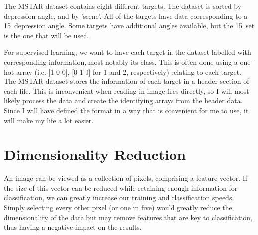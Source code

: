 The MSTAR dataset contains eight different targets. The dataset is sorted by depression angle, and by 'scene'. All of the targets have data corresponding to a 15\degree ~depression angle. Some targets have additional angles available, but the 15\degree ~set is the one that will be used. 

For supervised learning, we want to have each target in the dataset labelled with corresponding information, most notably its class. This is often done using a one-hot array (i.e. [1 0 0], [0 1 0] for 1 and 2, respectively) relating to each target. The MSTAR dataset stores the information of each target in a header section of each file. This is inconvenient when reading in image files directly, so I will most likely process the data and create the identifying arrays from the header data. Since I will have defined the format in a way that is convenient for me to use, it will make my life a lot easier.

\section{Dimensionality Reduction}
An image can be viewed as a collection of pixels, comprising a feature vector. If the size of this vector can be reduced while retaining enough information for classification, we can greatly increase our training and classification speeds. Simply selecting every other pixel (or one in five) would greatly reduce the dimensionality of the data but may remove features that are key to classification, thus having a negative impact on the results.
